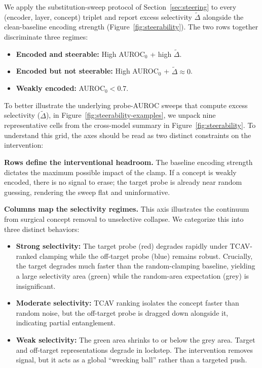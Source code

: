 \documentclass{article}
\begin{document}
We apply the substitution-sweep protocol of Section~\ref{sec:steering} to every (encoder, layer, concept) triplet and report excess selectivity $\tilde{\Delta}$ alongside the clean-baseline encoding strength (Figure~\ref{fig:steerability}). The two rows together discriminate three regimes:

\begin{itemize}
    \item \textbf{Encoded and steerable:} High AUROC$_0$ + high $\tilde{\Delta}$.
    \item \textbf{Encoded but not steerable:} High AUROC$_0$ + $\tilde{\Delta} \approx 0$.
    \item \textbf{Weakly encoded:} AUROC$_0 < 0.7$.
\end{itemize}

To better illustrate the underlying probe-AUROC sweeps that compute excess selectivity ($\tilde{\Delta}$), in Figure~\ref{fig:steerability-examples}, we unpack nine representative cells from the cross-model summary in Figure~\ref{fig:steerability}. To understand this grid, the axes should be read as two distinct constraints on the intervention:

\textbf{Rows define the interventional headroom.} The baseline encoding strength dictates the maximum possible impact of the clamp. If a concept is weakly encoded, there is no signal to erase; the target probe is already near random guessing, rendering the sweep flat and uninformative.

\textbf{Columns map the selectivity regimes.} This axis illustrates the continuum from surgical concept removal to unselective collapse. We categorize this into three distinct behaviors:
 
\begin{itemize}
    \item \textbf{Strong selectivity:} The target probe (red) degrades rapidly under TCAV-ranked clamping while the off-target probe (blue) remains robust. Crucially, the target degrades much faster than the random-clamping baseline, yielding a large selectivity area (green) while the random-area expectation (grey) is insignificant.
    \item \textbf{Moderate selectivity:} TCAV ranking isolates the concept faster than random noise, but the off-target probe is dragged down alongside it, indicating partial entanglement.
    \item \textbf{Weak selectivity:} The green area shrinks to or below the grey area. Target and off-target representations degrade in lockstep. The intervention removes signal, but it acts as a global ``wrecking ball'' rather than a targeted push.
\end{itemize}
\end{document}
